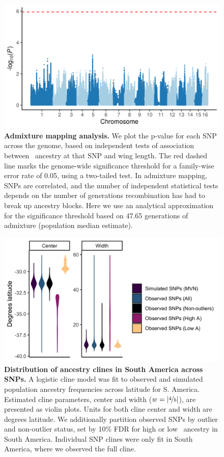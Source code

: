 \begin{figure}[ht]
\includegraphics[width=\textwidth]{chapter1/figures/admixture_mapping_wing_length.png}
\caption{ \textbf{Admixture mapping analysis.} We plot the p-value for each SNP across the genome, based on independent tests of association between \A\ ancestry at that SNP and wing length. The red dashed line marks the genome-wide significance threshold for a family-wise error rate of 0.05, using a two-tailed test. In admixture mapping, SNPs are correlated, and the number of independent statistical tests depends on the number of generations recombination has had to break up ancestry blocks. Here we use an analytical approximation for the significance threshold based on 47.65 generations of admixture (population median estimate).}
\label{admixture_mapping}
\end{figure}


\begin{figure}[ht]
\includegraphics[width=\textwidth]{chapter1/figures/violin_ind_snp_clines.png}
\caption{ \textbf{Distribution of ancestry clines in South America across SNPs.} A logistic cline model was fit to observed and simulated population ancestry frequencies across latitude for S. America. Estimated cline parameters, center and width ($w = |\nicefrac{4}{b}|$), are presented as violin plots. Units for both cline center and width are degrees latitude. We additionally partition observed SNPs by outlier and non-outlier status, set by 10\% FDR for high or low \A\ ancestry in South America. Individual SNP clines were only fit in South America, where we observed the full cline.}
\label{violin_ind_clines}
\end{figure}



